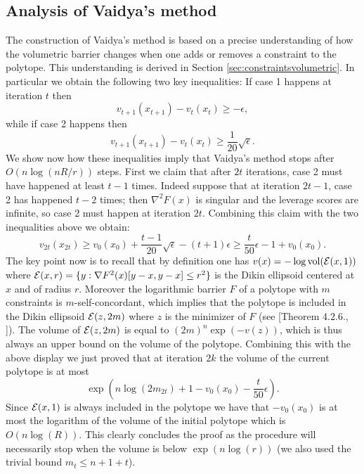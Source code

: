 \subsection{Analysis of Vaidya's method} \label{sec:analysis}
The construction of Vaidya's method is based on a precise understanding of how the volumetric barrier changes when one adds or removes a constraint to the polytope. This understanding is derived in Section \ref{sec:constraintsvolumetric}. In particular we obtain the following two key inequalities: If case 1 happens at iteration $t$ then
\begin{equation} \label{eq:analysis1}
v_{t+1}(x_{t+1}) - v_t(x_t) \geq - \epsilon ,
\end{equation}
while if case 2 happens then 
\begin{equation} \label{eq:analysis2}
v_{t+1}(x_{t+1}) - v_t(x_t) \geq \frac{1}{20} \sqrt{\epsilon} .
\end{equation}
We show now how these inequalities imply that Vaidya's method stops after $O(n \log(n R/r))$ steps. First we claim that after $2t$ iterations, case 2 must have happened at least $t-1$ times. Indeed suppose that at iteration $2t-1$, case 2 has happened $t-2$ times; then $\nabla^2 F(x)$ is singular and the leverage scores are infinite, so case 2 must happen at iteration $2t$. Combining this claim with the two inequalities above we obtain:
$$v_{2t}(x_{2t}) \geq v_0(x_0) + \frac{t-1}{20} \sqrt{\epsilon} - (t+1) \epsilon \geq \frac{t}{50} \epsilon - 1 +v_0(x_0) . $$
The key point now is to recall that by definition one has $v(x) = - \log \mathrm{vol}(\mathcal{E}(x,1))$ where $\mathcal{E}(x,r) = \{y : \nabla F^2(x)[y-x,y-x] \leq r^2\}$ is the Dikin ellipsoid centered at $x$ and of radius $r$. Moreover the logarithmic barrier $F$ of a polytope with $m$ constraints is $m$-self-concordant, which implies that the polytope is included in the Dikin ellipsoid $\mathcal{E}(z, 2m)$ where $z$ is the minimizer of $F$ (see [Theorem 4.2.6., \cite{Nes04}]). The volume of $\mathcal{E}(z, 2m)$ is equal to $(2m)^n \exp(-v(z))$, which is thus always an upper bound on the volume of the polytope. Combining this with the above display we just proved that at iteration $2k$ the volume of the current polytope is at most
$$\exp \left(n \log(2m_{2t}) + 1 - v_0(x_0) - \frac{t}{50} \epsilon \right) .$$
Since $\mathcal{E}(x,1)$ is always included in the polytope we have that $- v_0(x_0)$ is at most the logarithm of the volume of the initial polytope which is $O(n \log(R))$. This clearly concludes the proof as the procedure will necessarily stop when the volume is below $\exp(n \log(r))$ (we also used the trivial bound $m_t \leq n+1+t$).


